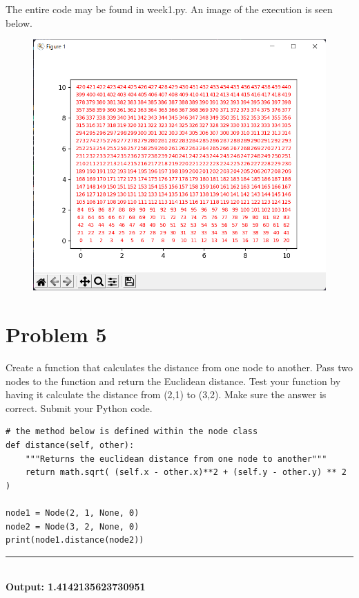 \documentclass{article}
\begin{document}
\newpage
\noindent The entire code may be found in week1.py. An image of the execution is seen below.


\begin{figure}[h]
    \centering
    \includegraphics[width=\textwidth]{question4.png}
\end{figure}

\section*{Problem 5}
 
Create a function that calculates the distance from one node to another. Pass two nodes to the 
function and return the Euclidean distance. Test your function by having it calculate the distance 
from (2,1) to (3,2). Make sure the answer is correct. 
\bigskip
\noindent Submit your Python code.
\begin{verbatim}
# the method below is defined within the node class
def distance(self, other):
    """Returns the euclidean distance from one node to another"""
    return math.sqrt( (self.x - other.x)**2 + (self.y - other.y) ** 2 )

node1 = Node(2, 1, None, 0)
node2 = Node(3, 2, None, 0)
print(node1.distance(node2))
\end{verbatim}

\noindent\rule{\textwidth}{0.4pt}\\
\textbf{Output: 1.4142135623730951}
\end{document}
